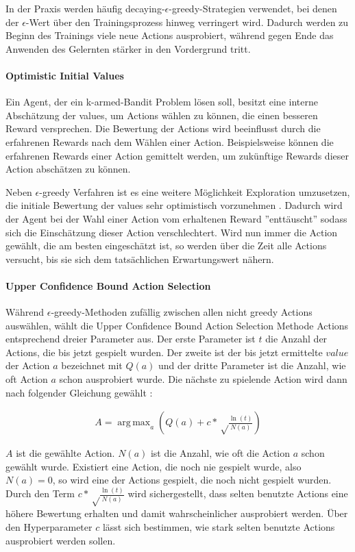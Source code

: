 \documentclass[11pt]{scrartcl}
\DeclareMathOperator*{\argmax}{arg\,max}
\begin{document}
In der Praxis werden häufig decaying-$\epsilon$-greedy-Strategien verwendet, bei denen der
$\epsilon$-Wert über den Trainingsprozess hinweg verringert wird. Dadurch werden zu Beginn
des Trainings viele neue Actions ausprobiert, während gegen Ende das Anwenden des
Gelernten stärker in den Vordergrund tritt.

\paragraph{Optimistic Initial Values}
Ein Agent, der ein k-armed-Bandit Problem lösen soll, besitzt eine interne Abschätzung der
values, um Actions wählen zu können, die einen besseren Reward versprechen. Die
Bewertung der Actions wird beeinflusst durch die erfahrenen Rewards nach dem Wählen einer
Action. Beispielsweise können die erfahrenen Rewards einer Action gemittelt werden, um
zukünftige Rewards dieser Action abschätzen zu können.

Neben $\epsilon$-greedy Verfahren ist es eine weitere Möglichkeit Exploration umzusetzen,
die initiale Bewertung der values sehr optimistisch vorzunehmen \cite[~S.26]{SB1998}.
Dadurch wird der Agent bei der Wahl einer Action vom erhaltenen Reward ''enttäuscht''
sodass sich die Einschätzung dieser Action verschlechtert. Wird nun immer die Action
gewählt, die am besten eingeschätzt ist, so werden über die Zeit alle Actions versucht,
bis sie sich dem tatsächlichen Erwartungswert nähern.

\paragraph{Upper Confidence Bound Action Selection}
Während $\epsilon$-greedy-Methoden zufällig zwischen allen nicht greedy Actions
auswählen, wählt die Upper Confidence Bound Ac\-tion Selection Methode Actions entsprechend
dreier Parameter aus.
Der erste Parameter ist $t$ die Anzahl der Actions, die bis jetzt gespielt wurden. Der
zweite ist der bis jetzt ermittelte $value$ der Action $a$ bezeichnet mit $Q(a)$ und der
dritte Parameter ist die Anzahl, wie oft Action $a$ schon ausprobiert wurde. Die nächste
zu spielende Action wird dann nach folgender Gleichung gewählt \cite[~S.27]{SB1998}:

\begin{align}
  A = \argmax_a\left( Q(a) + c*\sqrt\frac{\ln(t)}{N(a)} \right)
\end{align}

$A$ ist die gewählte Action. $N(a)$ ist die Anzahl, wie oft die Action $a$ schon gewählt
wurde. Existiert eine Action, die noch nie gespielt wurde, also $N(a)=0$, so wird eine der
Actions gespielt, die noch nicht gespielt wurden. Durch den Term
$c*\sqrt\frac{\ln(t)}{N(a)}$ wird sichergestellt, dass selten benutzte Actions eine höhere
Bewertung erhalten und damit wahrscheinlicher ausprobiert werden. Über den Hyperparameter
$c$ lässt sich bestimmen, wie stark selten benutzte Actions ausprobiert werden sollen.
\end{document}
